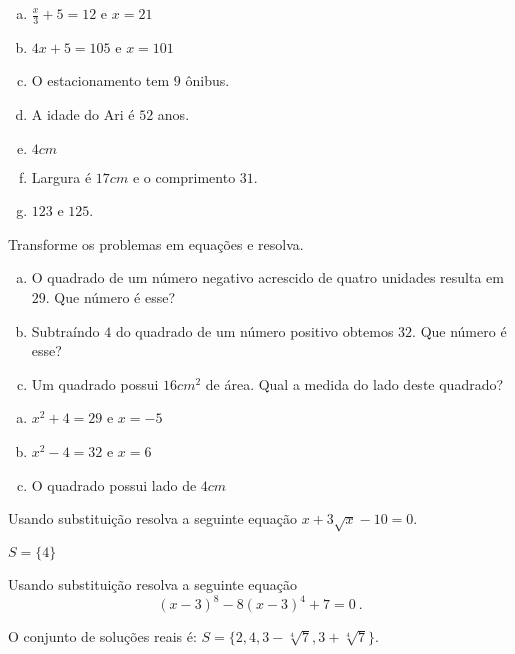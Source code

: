\begin{secExercicios}
\begin{resp}
\begin{multicols}{2}
\begin{enumerate}[a)]
\item $\frac{x}{3} + 5= 12$ e $x= 21$
\item $4x + 5= 105$ e $x= 101$
\item O estacionamento tem $9$ ônibus.
\item A idade do Ari é $52$ anos.
\item $4 cm$
\item Largura é $17cm$ e o comprimento $31$.
\item $123$ e $125$.
\end{enumerate}
\end{multicols}
\end{resp}

\begin{exer} Transforme os problemas em equações e resolva.
 \begin{enumerate}[a)]
\item O quadrado de um número negativo acrescido de quatro unidades resulta em $29$. Que número é esse?
\item Subtraíndo $4$ do quadrado de um número positivo obtemos $32$. Que número é esse?
\item Um quadrado possui $16 cm^2$ de área. Qual a medida do lado deste quadrado?
\end{enumerate}
\end{exer}
\begin{resp}
\begin{multicols}{3}
 \begin{enumerate}[a)]
\item $x^2 + 4= 29$ e $x= -5$
\item $x^2-4= 32$ e $x= 6$
\item O quadrado possui lado de $4 cm$
\end{enumerate}
\end{multicols}
\end{resp}

\begin{exer}
Usando substituição resolva a seguinte equação $x + 3\sqrt{x} - 10=0$.
\end{exer}
\begin{resp}
  $S= \{4 \}$
\end{resp}

\begin{exer}
Usando substituição resolva a seguinte equação \[(x-3)^8 - 8(x-3)^4 + 7=0 \ . \]
\end{exer}
\begin{resp}
O conjunto de soluções reais é:
 $S= \{2, 4, 3 - \sqrt[4]{7}, 3 + \sqrt[4]{7} \}$.
\end{resp}


\end{secExercicios}

